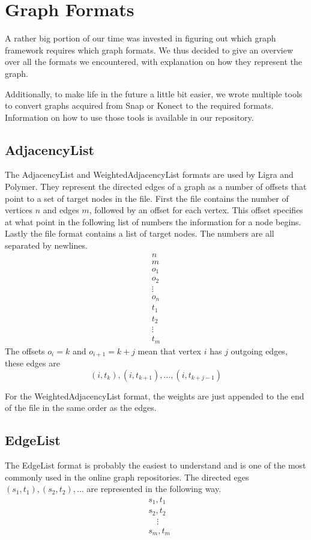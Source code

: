 
\section{Graph Formats}
A rather big portion of our time was invested in figuring out which graph framework requires which graph formats. We thus decided to give an overview over all the formats we encountered, with explanation on how they represent the graph.

Additionally, to make life in the future a little bit easier, we wrote multiple tools to convert graphs acquired from Snap or Konect to the required formats. Information on how to use those tools is available in our repository.

\subsection{AdjacencyList}
The AdjacencyList and WeightedAdjacencyList formats\cite{adjListFormat} are used by Ligra and Polymer. They represent the directed edges of a graph as a number of offsets that point to a set of target nodes in the file.
First the file contains the number of vertices $n$ and edges $m$, followed by an offset for each vertex. This offset specifies at what point in the following list of numbers the information for a node begins.
Lastly the file format contains a list of target nodes.
The numbers are all separated by newlines.
\begin{gather*}
n\\
m\\
o_1\\
o_2\\
\vdots\\
o_n\\
t_1\\
t_2\\
\vdots\\
t_m
\end{gather*}
The offsets $o_i=k$ and $o_{i+1}=k+j$ mean that vertex $i$ has $j$ outgoing edges, these edges are
\begin{equation*}
	(i,t_k),(i,t_{k+1}),\ldots,(i,t_{k+j-1})
\end{equation*}

For the WeightedAdjacencyList format, the weights are just appended to the end of the file in the same order as the edges.

\subsection{EdgeList}
The EdgeList format is probably the easiest to understand and is one of the most commonly used in the online graph repositories. The directed eges $(s_1,t_1),(s_2,t_2),\ldots$ are represented in the following way.
\begin{align*}
	&s_1,t_1\\
	&s_2,t_2\\
	&\quad\vdots\\
	&s_m,t_m
\end{align*}


